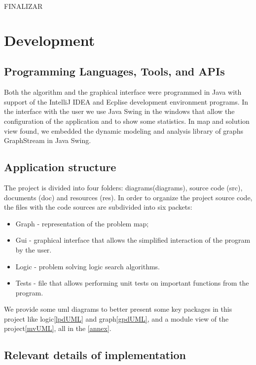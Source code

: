 \documentclass[a4paper]{article}
\begin{document}
FINALIZAR

\section{Development}

\subsection{Programming Languages, Tools, and APIs}

Both the algorithm and the graphical interface were programmed in Java with
support of the IntelliJ IDEA and Ecplise development environment programs. In the interface with the user we use Java Swing in the windows that allow the configuration of the application and to show some statistics. In map and solution view found, we embedded the dynamic modeling and analysis library of graphs GraphStream in Java Swing.

\subsection{Application structure}

The project is divided into four folders: diagrams(diagrams), source code (src), documents (doc) and resources (res). In order to organize the project source code, the files with the code sources are subdivided into six packets:

\begin{itemize}
\item Graph - representation of the problem map;
\item Gui - graphical interface that allows the simplified interaction of the program by the user.
\item Logic - problem solving logic search algorithms.
\item Tests - file that allows performing unit tests on important functions
from the program.

\end{itemize}

We provide some uml diagrams to better present some key packages in this project like logic\ref{lpdUML} and graph\ref{gpdUML}, and a module view of the project\ref{mvUML}, all in the \ref{annex}.

\subsection{Relevant details of implementation}
\end{document}
